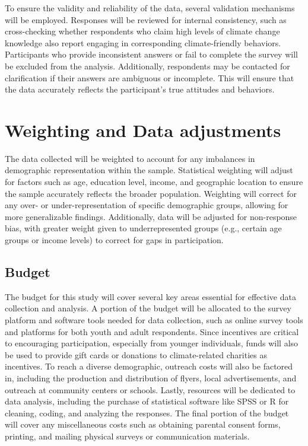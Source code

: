 \documentclass[
  letterpaper,
  DIV=11,
  numbers=noendperiod]{scrartcl}
\begin{document}
To ensure the validity and reliability of the data, several validation
mechanisms will be employed. Responses will be reviewed for internal
consistency, such as cross-checking whether respondents who claim high
levels of climate change knowledge also report engaging in corresponding
climate-friendly behaviors. Participants who provide inconsistent
answers or fail to complete the survey will be excluded from the
analysis. Additionally, respondents may be contacted for clarification
if their answers are ambiguous or incomplete. This will ensure that the
data accurately reflects the participant's true attitudes and behaviors.

\section{Weighting and Data
adjustments}\label{weighting-and-data-adjustments}

The data collected will be weighted to account for any imbalances in
demographic representation within the sample. Statistical weighting will
adjust for factors such as age, education level, income, and geographic
location to ensure the sample accurately reflects the broader
population. Weighting will correct for any over- or under-representation
of specific demographic groups, allowing for more generalizable
findings. Additionally, data will be adjusted for non-response bias,
with greater weight given to underrepresented groups (e.g., certain age
groups or income levels) to correct for gaps in participation.

\subsection{Budget}\label{budget}

The budget for this study will cover several key areas essential for
effective data collection and analysis. A portion of the budget will be
allocated to the survey platform and software tools needed for data
collection, such as online survey tools and platforms for both youth and
adult respondents. Since incentives are critical to encouraging
participation, especially from younger individuals, funds will also be
used to provide gift cards or donations to climate-related charities as
incentives. To reach a diverse demographic, outreach costs will also be
factored in, including the production and distribution of flyers, local
advertisements, and outreach at community centers or schools. Lastly,
resources will be dedicated to data analysis, including the purchase of
statistical software like SPSS or R for cleaning, coding, and analyzing
the responses. The final portion of the budget will cover any
miscellaneous costs such as obtaining parental consent forms, printing,
and mailing physical surveys or communication materials.
\end{document}
